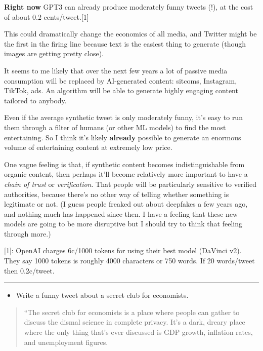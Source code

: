 \documentclass[
  11pt,
  letterpaper,
  DIV=11,
  numbers=noendperiod,
  oneside]{scrartcl}
\providecommand{\tightlist}{%
  \setlength{\itemsep}{0pt}\setlength{\parskip}{0pt}}\usepackage{longtable,booktabs,array}
\begin{document}
\textbf{Right now} GPT3 can already produce moderately funny tweets (!),
at the cost of about 0.2 cents/tweet.{[}1{]}

This could dramatically change the economics of all media, and Twitter
might be the first in the firing line because text is the easiest thing
to generate (though images are getting pretty close).

It seems to me likely that over the next few years a lot of passive
media consumption will be replaced by AI-generated content: sitcoms,
Instagram, TikTok, ads. An algorithm will be able to generate highly
engaging content tailored to anybody.

Even if the average synthetic tweet is only moderately funny, it's easy
to run them through a filter of humans (or other ML models) to find the
most entertaining. So I think it's likely \textbf{already} possible to
generate an enormous volume of entertaining content at extremely low
price.

One vague feeling is that, if synthetic content becomes
indistinguishable from organic content, then perhaps it'll become
relatively more important to have a \emph{chain of trust} or
\emph{verification}. That people will be particularly sensitive to
verified authorities, because there's no other way of telling whether
something is legitimate or not. (I guess people freaked out about
deepfakes a few years ago, and nothing much has happened since then. I
have a feeling that these new models are going to be more disruptive but
I should try to think that feeling through more.)

{[}1{]}: OpenAI charges 6c/1000 tokens for using their best model
(DaVinci v2). They say 1000 tokens is roughly 4000 characters or 750
words. If 20 words/tweet then 0.2c/tweet.

\begin{center}\rule{0.5\linewidth}{0.5pt}\end{center}

\begin{itemize}
\tightlist
\item
  Write a funny tweet about a secret club for economists.
\end{itemize}

\begin{quote}
``The secret club for economists is a place where people can gather to
discuss the dismal science in complete privacy. It's a dark, dreary
place where the only thing that's ever discussed is GDP growth,
inflation rates, and unemployment figures.
\end{quote}
\end{document}
